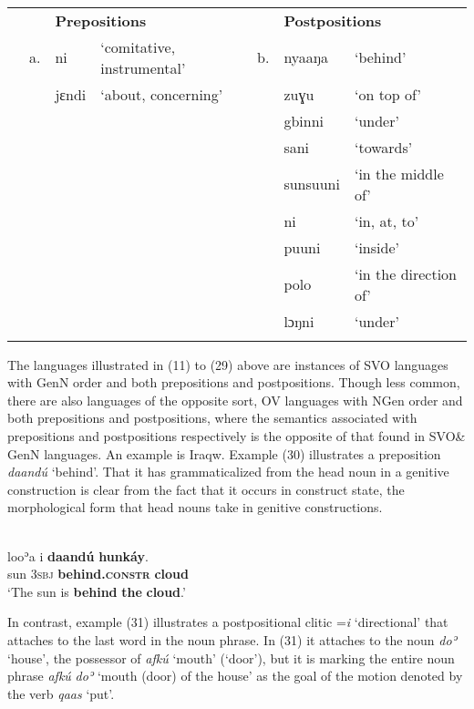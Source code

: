 \documentclass[output=paper]{langsci/langscibook}
\begin{document}
\begin{table}
\\
\begin{tabularx}{\textwidth}{XXXXXXX} &  & \multicolumn{2}{X}{\bfseries Prepositions} &  & \multicolumn{2}{X}{\bfseries Postpositions}\\
\lsptoprule
& a. & ni & ‘comitative, instrumental’ & b. & nyaaŋa & ‘behind’\\
&  & jɛndi & ‘about, concerning’ &  & zuɣu & ‘on top of’\\
&  &  &  &  & gbinni & ‘under’\\
&  &  &  &  & sani & ‘towards’\\
&  &  &  &  & sunsuuni & ‘in the middle of’\\
&  &  &  &  & ni & ‘in, at, to’\\
&  &  &  &  & puuni & ‘inside’\\
&  &  &  &  & polo & ‘in the direction of’\\
&  &  &  &  & lɔŋni & ‘under’\\
\lspbottomrule
\end{tabularx}
\end{table}


The languages illustrated in (11) to (29) above are instances of SVO languages with GenN order and both prepositions and postpositions. Though less common, there are also languages of the opposite sort, OV languages with NGen order and both prepositions and postpositions, where the semantics associated with prepositions and postpositions respectively is the opposite of that found in SVO\& GenN languages. An example is Iraqw. Example (30) illustrates a preposition \textit{daandú} ‘behind’. That it has grammaticalized from the head noun in a genitive construction is clear from the fact that it occurs in construct state, the morphological form that head nouns take in genitive constructions.

\ea\label{ex:dryer:}
\\
\gll   looʾa  i  \textbf{daandú}  \textbf{hunkáy}.\\
       sun  3\textsc{sbj}  \textbf{behind.\textsc{constr}}  \textbf{cloud} \\
\glt ‘The sun is \textbf{behind} \textbf{the} \textbf{cloud}.’
\z

In contrast, example (31) illustrates a postpositional clitic =\textit{i} ‘directional’ that attaches to the last word in the noun phrase. In (31) it attaches to the noun \textit{doʾ} ‘house’, the possessor of \textit{afkú} ‘mouth’ (‘door’), but it is marking the entire noun phrase \textit{afkú} \textit{doʾ} ‘mouth (door) of the house’ as the goal of the motion denoted by the verb \textit{qaas} ‘put’.
\end{document}
